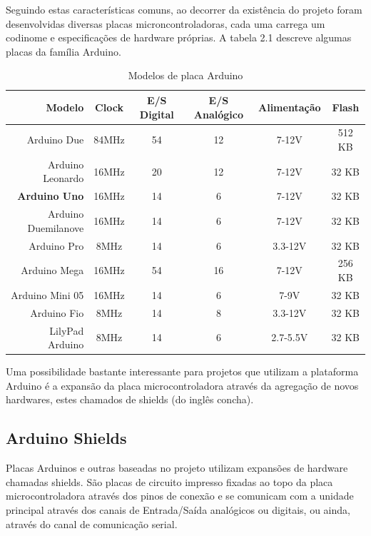 Seguindo estas características comuns, ao decorrer da existência do projeto foram desenvolvidas diversas placas microncontroladoras, cada uma carrega um codinome e especificações de hardware próprias. A tabela 2.1 descreve algumas placas da família Arduino.

\begin{table}[!h]
	\begin{tabular}{|r|c|c|c|c|c|}
		\hline 
			\textbf{Modelo} & \textbf{Clock} & \textbf{E/S Digital} & \textbf{E/S Analógico} & \textbf{Alimentação} & \textbf{Flash}
		\\
		\hline
			Arduino Due & 84MHz & 54 & 12 & 7-12V & 512 KB
		\\
		\hline
			Arduino Leonardo & 16MHz & 20 & 12 & 7-12V & 32 KB
		\\
		\hline
			\textbf{Arduino Uno} & 16MHz & 14 & 6 & 7-12V & 32 KB
		\\
		\hline
			Arduino Duemilanove & 16MHz & 14 & 6 & 7-12V & 32 KB
		\\
		\hline
			Arduino Pro & 8MHz & 14 & 6 & 3.3-12V & 32 KB
		\\
		\hline
			Arduino Mega & 16MHz & 54 & 16 & 7-12V & 256 KB
		\\
		\hline
			Arduino Mini 05 & 16MHz & 14 & 6 & 7-9V & 32 KB
		\\
		\hline
			Arduino Fio & 8MHz & 14 & 8 & 3.3-12V & 32 KB
		\\
		\hline
			LilyPad Arduino & 8MHz & 14 & 6 & 2.7-5.5V & 32 KB
		\\


\hline
\end{tabular}
\caption{Modelos de placa Arduino}
\end{table}

Uma possibilidade bastante interessante para projetos que utilizam a plataforma Arduino é a expansão da placa microcontroladora através da agregação de novos hardwares, estes chamados de shields (do inglês concha).

\subsection{Arduino Shields}

Placas Arduinos e outras baseadas no projeto utilizam expansões de hardware chamadas shields. São placas de circuito impresso fixadas ao topo da placa microcontroladora através dos pinos de conexão e se comunicam com a unidade principal através dos canais de Entrada/Saída analógicos ou digitais, ou ainda, através do canal de comunicação serial.

